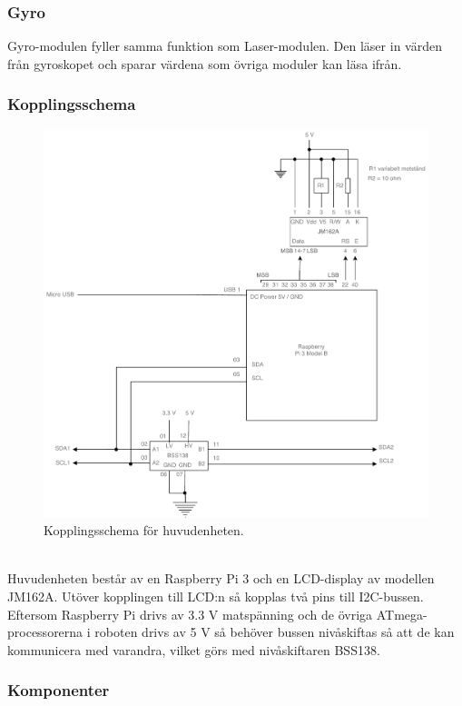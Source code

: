 \documentclass{article}
\begin{document}
\subsubsection{Gyro}
Gyro-modulen fyller samma funktion som Laser-modulen. Den läser in värden från gyroskopet och sparar värdena som övriga moduler kan läsa ifrån.


\subsubsection{Kopplingsschema}

\begin{figure}[H]
\centering
\includegraphics[scale=0.45]{Huvudenhet_kopplingsschema}
\caption{Kopplingsschema för huvudenheten.}
\label{fig:huvudenhet_kopplingsschema}
\end{figure}
\ \\
Huvudenheten består av en Raspberry Pi 3 och en LCD-display av modellen JM162A. Utöver kopplingen till LCD:n så kopplas två pins till I2C-bussen. Eftersom Raspberry Pi drivs av 3.3 V matspänning och de övriga ATmega-processorerna i roboten drivs av 5 V så behöver bussen nivåskiftas så att de kan kommunicera med varandra, vilket görs med nivåskiftaren BSS138.

\subsubsection{Komponenter}
\end{document}
